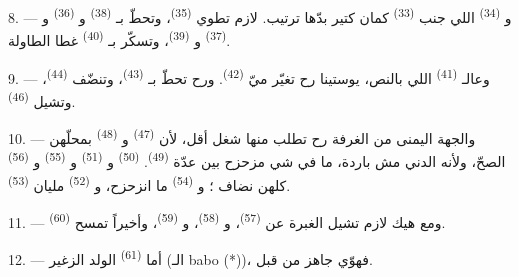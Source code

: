 \VUsaut{5.0mm}
\VUsaut{3.0mm}

8. --- و \textsuperscript{(34)} اللي جنب
 \textsuperscript{(33)} كمان كتير بدّها ترتيب. لازم
تطوي  \textsuperscript{(35)}، وتحطّ
بـ \textsuperscript{(38)} 
و \textsuperscript{(36)} و \textsuperscript{(37)}
و \textsuperscript{(39)}، وتسكّر بـ
\textsuperscript{(40)} غطا الطاولة.

9. --- وعالـ \textsuperscript{(41)} اللي
بالنص، يوستينا رح تغيّر ميّ  \textsuperscript{(42)}. ورح
تحطّ  بـ \textsuperscript{(43)}، وتنضّف
 \textsuperscript{(44)}، وتشيل 
\textsuperscript{(46)}.

10. --- والجهة اليمنى من الغرفة رح تطلب منها شغل أقل، لأن
 \textsuperscript{(47)} و
\textsuperscript{(48)} بمحلّهن الصحّ، ولأنه الدني مش باردة، ما في شي
مزحزح بين عدّة  \textsuperscript{(49)}.
 \textsuperscript{(50)} و \textsuperscript{(51)}
و \textsuperscript{(55)} و
\textsuperscript{(56)} كلهن نضاف ؛ و
\textsuperscript{(54)} ما انزحزح، و
\textsuperscript{(52)} مليان  \textsuperscript{(53)}.



11. --- ومع هيك لازم تشيل الغبرة عن 
\textsuperscript{(57)}، و \textsuperscript{(58)}،
و \textsuperscript{(59)}، وأخيراً تمسح
 \textsuperscript{(60)}.

12. --- أما  \textsuperscript{(61)} الولد الزغير (الـ
babo (*))، فهوّي جاهز من قبل.

\VUsaut{5.0mm}
\VUsaut{3.0mm}

